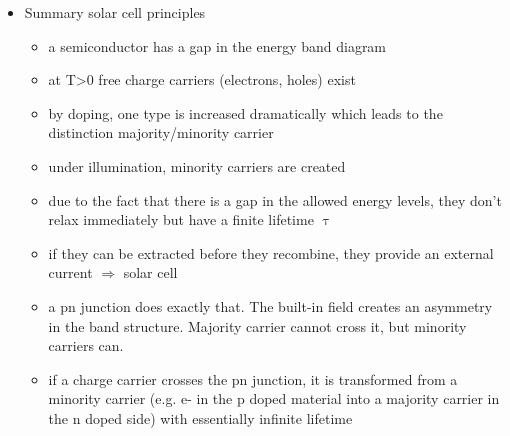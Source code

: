 \begin{itemize}
 \item Summary solar cell principles
 \begin{itemize}
  \item a semiconductor has a gap in the energy band diagram
  \item at T>0 free charge carriers (electrons, holes) exist
  \item by doping, one type is increased dramatically which leads to the distinction majority/minority carrier
  \item under illumination, minority carriers are created
  \item due to the fact that there is a gap in the allowed energy levels, they don’t relax immediately but have a finite lifetime $\uptau$
  \item if they can be extracted before they recombine, they provide an external current $\Rightarrow$ solar cell
  \item a pn junction does exactly that. The built-in field creates an asymmetry in the band structure. Majority carrier cannot cross it, but minority carriers can.
  \item if a charge carrier crosses the pn junction, it is transformed from a minority carrier (e.g. e- in the p doped material into a majority carrier in the n doped side) with 
  essentially infinite lifetime
 \end{itemize}
\end{itemize}

